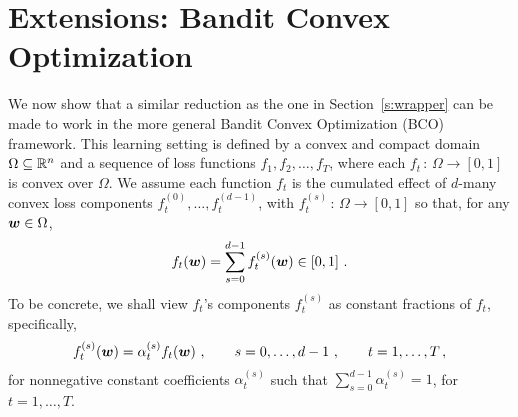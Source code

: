
\newcommand{\fcomp}{f^{\circ}}
\newcommand{\scD}{\mathcal{D}}
\newcommand{\bb}{\boldsymbol{b}}
\newcommand{\B}{\field{B}}

\section{Extensions: Bandit Convex Optimization}\label{s:bco}
%
We now show that a similar reduction as the one in Section~\ref{s:wrapper} can be made to work in the more general Bandit Convex Optimization (BCO) framework. This learning setting is defined by a convex and compact domain $\Omega \subseteq \mathbb{R}^n$ and a sequence of loss functions $f_1, f_2, \ldots, f_T$, where each $f_t\,:\,\Omega \to [0,1]$ is convex over $\Omega$. We assume each function $f_t$ is the cumulated effect of $d$-many convex loss components $f_t^{(0)},\ldots, f_t^{(d-1)}$, with $f_t^{(s)}\,:\,\Omega \to [0,1]$ so that, for any $\boldsymbol{w} \in \Omega$,
%
\[
f_t(\boldsymbol{w}) = \sum_{s=0}^{d-1} f_t^{(s)}(\boldsymbol{w}) \in [0,1]~.
\]
To be concrete, we shall view $f_t$'s components $f_t^{(s)}$ as constant fractions of $f_t$, specifically,
\[
f_t^{(s)}(\boldsymbol{w}) = \alpha^{(s)}_{t} f_t(\boldsymbol{w})~, \qquad s = 0,\ldots, d-1~, \qquad t = 1,\ldots, T\,,
\]
for nonnegative constant coefficients $\alpha^{(s)}_{t}$ such that $\sum_{s=0}^{d-1}\alpha^{(s)}_{t} =1$, for $t = 1, \ldots, T$.

